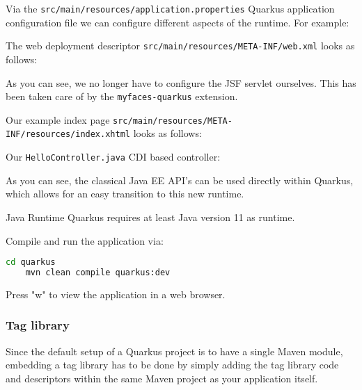 Via the \texttt{src/main/resources/application.properties}  Quarkus application configuration file we can configure different aspects of the runtime. For example:


The web deployment descriptor \texttt{src/main/resources/META-INF/web.xml} looks as follows:

As you can see, we no longer have to configure the JSF servlet ourselves.
This has been taken care of by the \texttt{myfaces-quarkus} extension.

Our example index page \texttt{src/main/resources/META-INF/resources/index.xhtml} looks as follows:


Our \texttt{HelloController.java} CDI based controller:

As you can see, the classical Java EE API's can be used directly within Quarkus, which allows for an easy transition to this new runtime.

\begin{TIP}{Java Runtime}
	Quarkus requires at least Java version 11 as runtime.
\end{TIP}

Compile and run the application via:
\begin{lstlisting}[language=bash]
	cd quarkus
	mvn clean compile quarkus:dev
\end{lstlisting}
Press "w" to view the application in a web browser.

\subsubsection{Tag library}
Since the default setup of a Quarkus project is to have a single Maven module,
embedding a tag library has to be done by simply adding the tag library code and descriptors within the same Maven project as your application itself.


